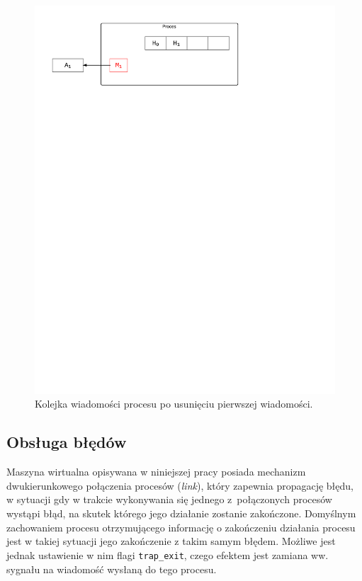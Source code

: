 \begin{figure}[h]
\centerline{\includegraphics[scale=0.75, clip, trim=10mm 220mm 68mm 10mm]{mp4}}
\caption{Kolejka wiadomości procesu po usunięciu pierwszej wiadomości.}
\label{fig:mp4}
\end{figure}

\subsection{Obsługa błędów}
\label{sub:procBledy}

Maszyna wirtualna opisywana w niniejszej pracy posiada mechanizm dwukierunkowego połączenia procesów (\emph{link}), który zapewnia propagację błędu, w sytuacji gdy w trakcie wykonywania się jednego z~połączonych procesów wystąpi błąd, na skutek którego jego działanie zostanie zakończone.
Domyślnym zachowaniem procesu otrzymującego informację o zakończeniu działania procesu jest w takiej sytuacji jego zakończenie z takim samym błędem.
Możliwe jest jednak ustawienie w nim flagi \texttt{trap\_exit}, czego efektem jest zamiana ww. sygnału na wiadomość wysłaną do tego procesu.

